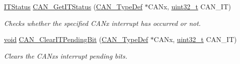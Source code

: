 \begin{DoxyCompactItemize}
\hyperlink{agilefox_2library_2inc_2stm32f10x__type_8h_aacbd7ed539db0aacd973a0f6eca34074}{I\+T\+Status} \hyperlink{group___c_a_n___private___functions_ga9aca05b3013e1b3438f3559f80b33c82}{C\+A\+N\+\_\+\+Get\+I\+T\+Status} (\hyperlink{struct_c_a_n___type_def}{C\+A\+N\+\_\+\+Type\+Def} $\ast$C\+A\+Nx, \hyperlink{_p_e___types_8h_a33594304e786b158f3fb30289278f5af}{uint32\+\_\+t} C\+A\+N\+\_\+\+IT)
\begin{DoxyCompactList}\small\item\em Checks whether the specified C\+A\+Nx interrupt has occurred or not. \end{DoxyCompactList}\item 
\hyperlink{usb__devapi_8h_afabf60e7f57651d6d595a02c75f07cd0}{void} \hyperlink{group___c_a_n___private___functions_ga30bf7ac0c1793f6622a4a1adbb7dbc8a}{C\+A\+N\+\_\+\+Clear\+I\+T\+Pending\+Bit} (\hyperlink{struct_c_a_n___type_def}{C\+A\+N\+\_\+\+Type\+Def} $\ast$C\+A\+Nx, \hyperlink{_p_e___types_8h_a33594304e786b158f3fb30289278f5af}{uint32\+\_\+t} C\+A\+N\+\_\+\+IT)
\begin{DoxyCompactList}\small\item\em Clears the C\+A\+Nx\textquotesingle{}s interrupt pending bits. \end{DoxyCompactList}\end{DoxyCompactItemize}
